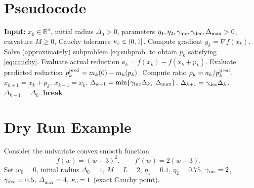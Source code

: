 \documentclass{article}
\newcommand{\R}{\mathbb{R}}
\begin{document}
\section*{Pseudocode}
\begin{algorithm}[H]
\caption{Trust‑Region Gradient Method (TR‑GM)}
\begin{algorithmic}[1]
\STATE \textbf{Input:} $x_0\in\R^n$, initial radius $\Delta_0>0$, parameters
$\eta_1,\eta_2,\gamma_{\rm inc},\gamma_{\rm dec},\Delta_{\max}>0$, curvature $M\ge0$, Cauchy tolerance $\kappa_{\rm c}\in(0,1]$.
    \STATE Compute gradient $g_k=\nabla f(x_k)$.
    \STATE Solve (approximately) subproblem \eqref{eq:subprob} to obtain $p_k$ satisfying \eqref{eq:cauchy}.
    \STATE Evaluate actual reduction $a_k=f(x_k)-f(x_k+p_k)$.
    \STATE Evaluate predicted reduction $p_k^{\rm pred}=m_k(0)-m_k(p_k)$.
    \STATE Compute ratio $\rho_k = a_k/p_k^{\rm pred}$.
        \STATE $x_{k+1}=x_k+p_k$.
    \ELSE
        \STATE $x_{k+1}=x_k$.
    \ENDIF
        \STATE $\Delta_{k+1}= \min\{\gamma_{\rm inc}\Delta_k,\;\Delta_{\max}\}$.
        \STATE $\Delta_{k+1}= \gamma_{\rm dec}\Delta_k$.
    \ELSE
        \STATE $\Delta_{k+1}= \Delta_k$.
    \ENDIF
     \textbf{break}
    \ENDIF
\ENDFOR
\end{algorithmic}
\end{algorithm}

\section*{Dry Run Example}
Consider the univariate convex smooth function
\[
f(w)=(w-3)^2,\qquad f'(w)=2(w-3).
\]
Set $w_0=0$, initial radius $\Delta_0=1$, $M=L=2$, $\eta_1=0.1$, $\eta_2=0.75$, $\gamma_{\rm inc}=2$, $\gamma_{\rm dec}=0.5$, $\Delta_{\max}=4$, $\kappa_{\rm c}=1$ (exact Cauchy point).
\end{document}
